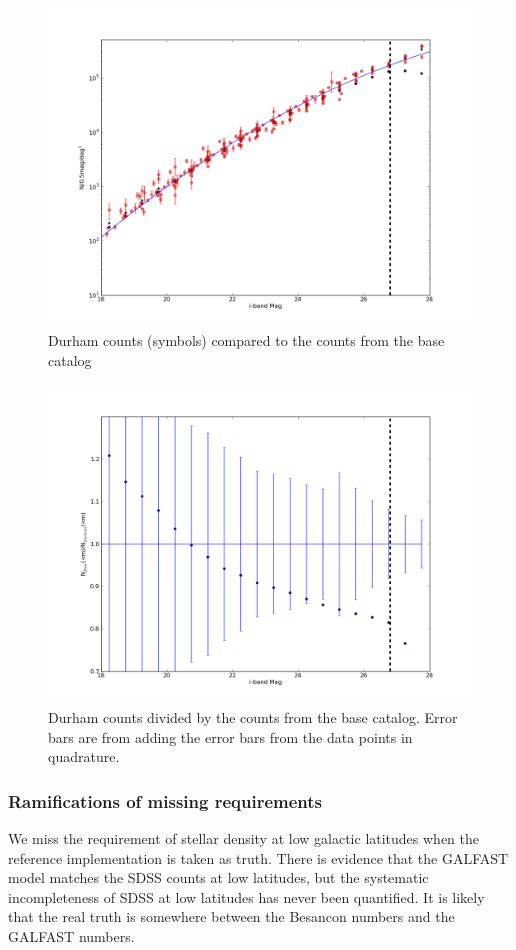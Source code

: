 \documentclass[]{article}
\begin{document}
\begin{figure}
\centering
\includegraphics[width=5in]{validation_figures/Ngals-i.png}
\caption{Durham counts (symbols) compared to the counts from the base catalog \label{fig:gcounts}}
\end{figure}
\begin{figure}
\centering
\includegraphics[width=5in]{validation_figures/CumulativeFraction_i.png}
\caption{Durham counts divided by the counts from the base catalog.  Error bars are from adding the error bars from the data points in quadrature. \label{fig:gratio}}
\end{figure}

\subsubsection{Ramifications of missing requirements}
We miss the requirement of stellar density at low galactic latitudes when the reference implementation is taken as truth.  There is evidence that the GALFAST
model matches the SDSS counts at low latitudes, but the systematic incompleteness of SDSS at low latitudes has never been quantified.
It is likely that the real truth is somewhere between the Besancon numbers and the GALFAST numbers.
\end{document}
